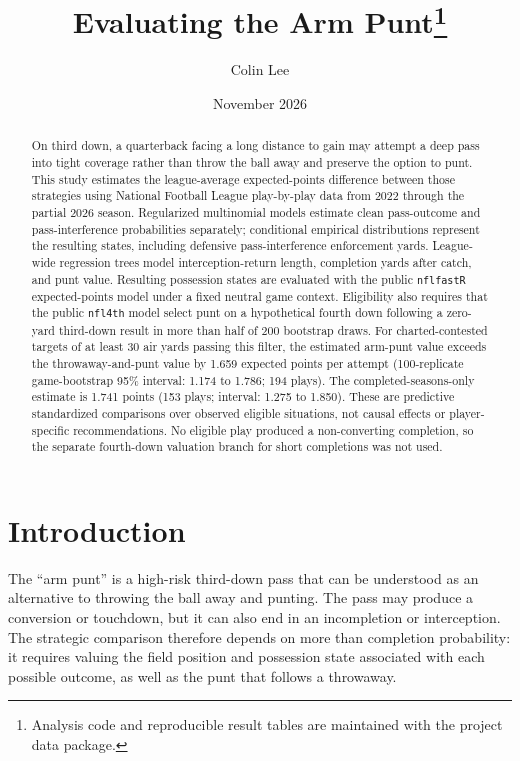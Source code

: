 \documentclass[11pt]{article}
\title{Evaluating the Arm Punt\thanks{Analysis code and reproducible result tables are maintained with the project data package.}}
\author{Colin Lee}
\date{November 2026}
\begin{document}
\maketitle

\begin{abstract}
On third down, a quarterback facing a long distance to gain may attempt a deep pass into tight coverage rather than throw the ball away and preserve the option to punt. This study estimates the league-average expected-points difference between those strategies using National Football League play-by-play data from 2022 through the partial 2026 season. Regularized multinomial models estimate clean pass-outcome and pass-interference probabilities separately; conditional empirical distributions represent the resulting states, including defensive pass-interference enforcement yards. League-wide regression trees model interception-return length, completion yards after catch, and punt value. Resulting possession states are evaluated with the public \texttt{nflfastR} expected-points model under a fixed neutral game context. Eligibility also requires that the public \texttt{nfl4th} model select punt on a hypothetical fourth down following a zero-yard third-down result in more than half of 200 bootstrap draws. For charted-contested targets of at least 30 air yards passing this filter, the estimated arm-punt value exceeds the throwaway-and-punt value by 1.659 expected points per attempt (100-replicate game-bootstrap 95\% interval: 1.174 to 1.786; 194 plays). The completed-seasons-only estimate is 1.741 points (153 plays; interval: 1.275 to 1.850). These are predictive standardized comparisons over observed eligible situations, not causal effects or player-specific recommendations. No eligible play produced a non-converting completion, so the separate fourth-down valuation branch for short completions was not used.
\end{abstract}

\section{Introduction}

The ``arm punt'' is a high-risk third-down pass that can be understood as an alternative to throwing the ball away and punting. The pass may produce a conversion or touchdown, but it can also end in an incompletion or interception. The strategic comparison therefore depends on more than completion probability: it requires valuing the field position and possession state associated with each possible outcome, as well as the punt that follows a throwaway.
\end{document}
